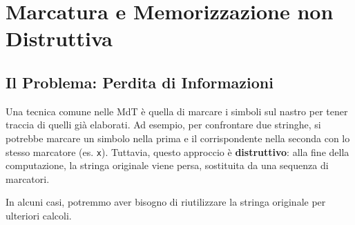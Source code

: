 \documentclass[a4paper]{article}
\theoremstyle{definition} %
\newcommand{\blankS}{\ensuremath{\raisebox{-0.15ex}{\scalebox{1.3}[0.7]{$\sqcup$}}}}
\begin{document}
\section{Marcatura e Memorizzazione non Distruttiva}
\subsection{Il Problema: Perdita di Informazioni}
Una tecnica comune nelle MdT è quella di marcare i simboli sul nastro per tener traccia di quelli già elaborati. Ad esempio, per confrontare due stringhe, si potrebbe marcare un simbolo nella prima e il corrispondente nella seconda con lo stesso marcatore (es. \texttt{x}).
Tuttavia, questo approccio è \textbf{distruttivo}: alla fine della computazione, la stringa originale viene persa, sostituita da una sequenza di marcatori.
\begin{center}
\end{center}

In alcuni casi, potremmo aver bisogno di riutilizzare la stringa originale per ulteriori calcoli.
\end{document}
